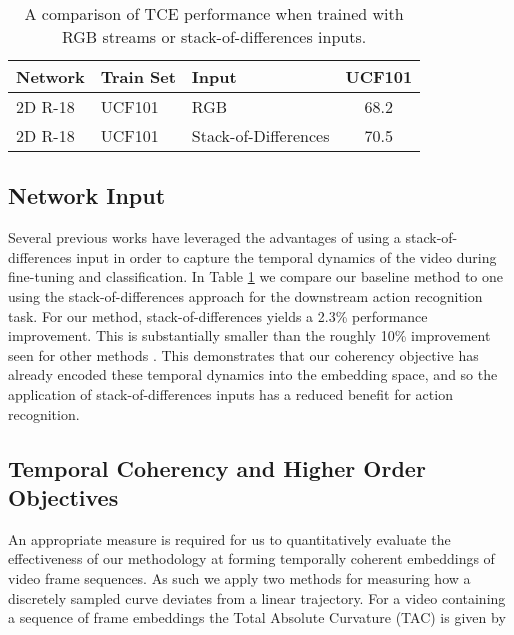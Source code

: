 \documentclass[a4paper,conference]{IEEEtran}
\begin{document}
\begin{table}
    \caption{A comparison of TCE performance when trained with RGB streams or stack-of-differences inputs.}
    \centering
    \begin{tabular}{lll|c}
        \hline \hline 
        \textbf{Network} & \textbf{Train Set} & \textbf{Input} & \textbf{UCF101} \\
        \hline \hline 
        2D R-18 & UCF101 & RGB & 68.2 \\
        \hline 
        2D R-18 & UCF101 & Stack-of-Differences & 70.5 \\
        \hline 

    \end{tabular}
    \label{tab:inputs}
\end{table}

\subsection{Network Input}
\label{sec:StackOfDif}

Several previous works \cite{fernando2017self,kim2019self, lee2017unsupervised} have leveraged the advantages of using a stack-of-differences input in order to capture the temporal dynamics of the video during fine-tuning and classification. In Table \ref{tab:inputs} we compare our baseline method to one using the stack-of-differences approach for the downstream action recognition task. For our method, stack-of-differences yields a 2.3\% performance improvement. This is substantially smaller than the roughly 10\% improvement seen for other methods \cite{kim2019self,lee2017unsupervised}. This demonstrates that our coherency objective has already encoded these temporal dynamics into the embedding space, and so the application of stack-of-differences inputs has a reduced benefit for action recognition.

\subsection{Temporal Coherency and Higher Order Objectives}
\label{sec:CohenenceEval}

An appropriate measure is required for us to quantitatively evaluate the effectiveness of our methodology at forming temporally coherent embeddings of video frame sequences. As such we apply two methods for measuring how a discretely sampled curve deviates from a linear trajectory.
For a video  containing a sequence of  frame embeddings  the Total Absolute Curvature (TAC) is given by
\end{document}
